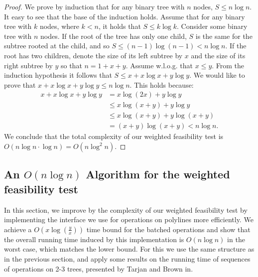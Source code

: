 \documentclass[11pt,a4paper]{article}
\theoremstyle{definition}
\theoremstyle{remark}
\begin{document}
\begin{proof}
We prove by induction that for any binary tree with $n$ nodes, $S \leq n \log n$. It easy to see that the base of the induction holds. Assume that for any binary tree with $k$ nodes, where $k<n$, it holds that $S \leq k\log k$. Consider some binary tree with $n$ nodes. If the root of the tree has only one child, $S$ is the same for the subtree rooted at the child, and so $S \leq (n-1)\log (n-1) < n \log n$. If the root has two children, denote the size of its left subtree by $x$ and the size of its right subtree by $y$ so that $n=1+x+y$. Assume w.l.o.g. that $x \leq y$. From the induction hypothesis it follows that $S \leq x + x \log x + y \log y$. We would like to prove that $x + x \log x + y \log y \leq n \log n$. This holds because:
\begin{align*}
x + x\log x + y\log y &= x \log (2x) + y\log y \\
& \leq x \log (x+y) + y\log y \\
& \leq x \log (x+y) + y \log (x+y) \\
& = (x+y)\log(x+y) < n \log n.
\end{align*}
We conclude that the total complexity of our weighted feasibility test is $O(n \log n \cdot \log n) = O(n \log ^2 n)$.
\end{proof}


\subsection{An \boldmath$O(n \log n)$ Algorithm for the weighted feasibility test}
In this section, we improve by the complexity of our weighted feasibility test by implementing the interface we use for operations on polylines more efficiently. We achieve a $O(x \log (\frac{y}{x}))$ time bound for the batched operations and show that the overall running time induced by this implementation is $O(n \log n)$ in the worst case, which matches the lower bound. For this we use the same structure as in the previous section, and apply some results on the running time of sequences of operations on 2-3 trees, presented by Tarjan and Brown in. %

\end{document}
